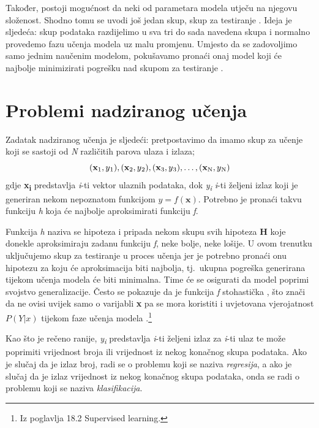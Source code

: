 \documentclass[times, utf8, zavrsni]{fer}
\begin{document}
Također, postoji mogućnost da neki od parametara modela utječu na njegovu složenost. Shodno tomu se uvodi još jedan skup, skup za testiranje . Ideja je sljedeća: skup podataka razdijelimo u sva tri do sada navedena skupa i normalno provedemo fazu učenja modela uz malu promjenu. Umjesto da se zadovoljimo samo jednim naučenim modelom, pokušavamo pronaći onaj model koji će najbolje minimizirati pogrešku nad skupom za testiranje \citep{cupicML}.

\section{Problemi nadziranog učenja}
Zadatak nadziranog učenja je sljedeći: pretpostavimo da imamo skup za učenje koji se sastoji od \textit{N} različitih parova ulaza i izlaza;
\[(\textbf{x}\textsubscript{1}, y\textsubscript{1}), (\textbf{x}\textsubscript{2}, y\textsubscript{2}),
(\textbf{x}\textsubscript{3}, y\textsubscript{3}),\dots,
(\textbf{x}\textsubscript{N}, y\textsubscript{N})\]
gdje \textbf{x\textsubscript{i}} predstavlja \textit{i}-ti vektor ulaznih podataka, dok \textit{y\textsubscript{i}} \textit{i}-ti željeni izlaz koji je generiran nekom nepoznatom funkcijom $y=f(\textbf{x})$. \newline
Potrebno je pronaći takvu funkciju \textit{h} koja će najbolje aproksimirati funkciju \textit{f}.

Funkcija \textit{h} naziva se hipoteza  i pripada nekom skupu svih hipoteza \textbf{H} koje donekle aproksimiraju zadanu funkciju \textit{f}, neke bolje, neke lošije. U ovom trenutku uključujemo skup za testiranje u proces učenja jer je potrebno pronaći onu hipotezu za koju će aproksimacija biti najbolja, tj.\ ukupna pogreška generirana tijekom učenja modela će biti minimalna. Time će se osigurati da model poprimi svojstvo generalizacije. Često se pokazuje da je funkcija \textit{f} stohastička , što znači da ne ovisi uvijek samo o varijabli \textbf{x} pa se mora koristiti i uvjetovana vjerojatnost $P(Y|x)$ tijekom faze učenja modela \citep{russelAI}.\footnote{Iz poglavlja 18.2 Supervised learning.}

Kao što je rečeno ranije, \textit{y\textsubscript{i}} predstavlja \textit{i}-ti željeni izlaz za \textit{i}-ti ulaz te može poprimiti vrijednost broja ili vrijednost iz nekog konačnog skupa podataka. Ako je slučaj da je izlaz broj, radi se o problemu koji se naziva \textit{regresija}, a ako je slučaj da je izlaz vrijednost iz nekog konačnog skupa podataka, onda se radi o problemu koji se naziva \textit{klasifikacija}.
\end{document}
